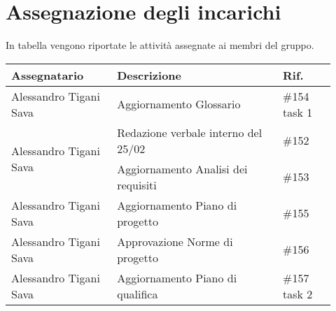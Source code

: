 \section{Assegnazione degli incarichi}
In tabella vengono riportate le attività assegnate ai membri del gruppo.
\begin{center}
	{
		\renewcommand{\arraystretch}{1.5}
		\begin{tabular}{p{0.30\linewidth}|p{0.47\linewidth}|p{0.15\linewidth}}
			\textbf{Assegnatario}             	& \textbf{Descrizione}								& \textbf{Rif.} \\

			\hline
			Alessandro Tigani Sava				& Aggiornamento Glossario					& \#154 task 1	\\
			\hline
			\multirow{2}{*}{Alessandro Tigani Sava}    &  Redazione verbale interno del 25/02	& \#152	\\
			\cline{2-3}
			                                	& Aggiornamento Analisi dei requisiti 			& \#153	\\
			\hline
			Alessandro Tigani Sava				& Aggiornamento Piano di progetto				& \#155	\\
			\hline
			Alessandro Tigani Sava				& Approvazione Norme di progetto				& \#156	\\
			\hline
			Alessandro Tigani Sava				& Aggiornamento Piano di qualifica				& \#157 task 2	\\
			\hline
		\end{tabular}
	}
\end{center}

